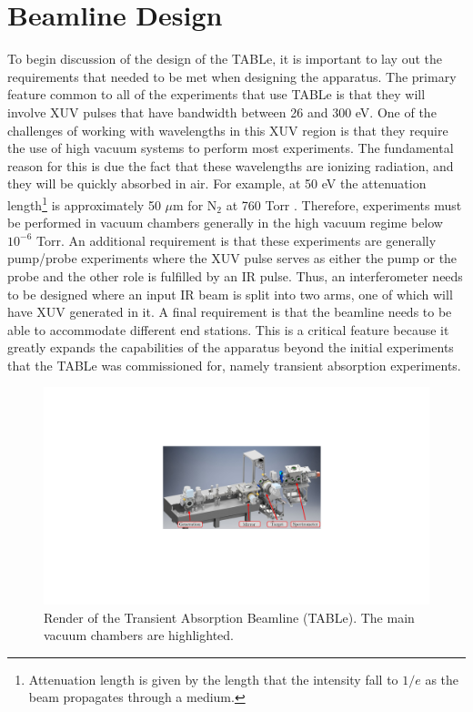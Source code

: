 \section{Beamline Design}
\label{sec:full_beamline}
To begin discussion of the design of the TABLe, it is important to lay out the requirements that needed to be met when designing the apparatus. The primary feature common to all of the experiments that use TABLe is that they will involve XUV pulses that have bandwidth between 26 and 300 eV.  One of the challenges of working with wavelengths in this XUV region is that they require the use of high vacuum systems to perform most experiments.  The fundamental reason for this is due the fact that these wavelengths are ionizing radiation, and they will be quickly absorbed in air.  For example, at 50 eV the attenuation length\footnote{Attenuation length is given by the length that the intensity fall to $1/e$ as the beam propagates through a medium.} is approximately 50 $\mu$m for N$_2$ at 760 Torr \cite{henkeLowenergyXrayInteraction1982}.  Therefore, experiments must be performed in vacuum chambers generally in the high vacuum regime below $10^{-6}$ Torr.  An additional requirement is that these experiments are generally pump/probe experiments where the XUV pulse serves as either the pump or the probe and the other role is fulfilled by an IR pulse.  Thus, an interferometer needs to be designed where an input IR beam is split into two arms, one of which will have XUV generated in it.  A final requirement is that the beamline needs to be able to accommodate different end stations.  This is a critical feature because it greatly expands the capabilities of the apparatus beyond the initial experiments that the TABLe was commissioned for, namely transient absorption experiments.
\begin{figure}
	\centering
	\includegraphics[width=1.0\textwidth]{figures/Beamline/CAD_beamline.pdf}
	\caption[Render of the TABLe]{Render of the Transient Absorption Beamline (TABLe).  The main vacuum chambers are highlighted.}
	\label{fig:CAD_render_TABLe}
\end{figure}
